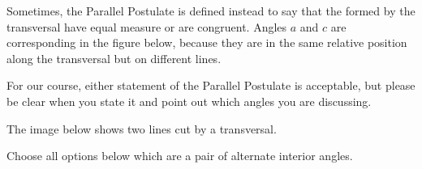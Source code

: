 \documentclass{ximera}
\begin{document}
Sometimes, the Parallel Postulate is defined instead to say that the  formed by the transversal have equal measure or are congruent. Angles $a$ and $c$ are corresponding in the figure below, because they are in the same relative position along the transversal but on different lines.

\begin{image}
\end{image}

For our course, either statement of the Parallel Postulate is acceptable, but please be clear when you state it and point out which angles you are discussing.

\begin{question}
The image below shows two lines cut by a transversal.
\begin{image}
\end{image}
Choose all options below which are a pair of alternate interior angles. 
\begin{selectAll}
\end{selectAll}
\end{question}
\end{document}
